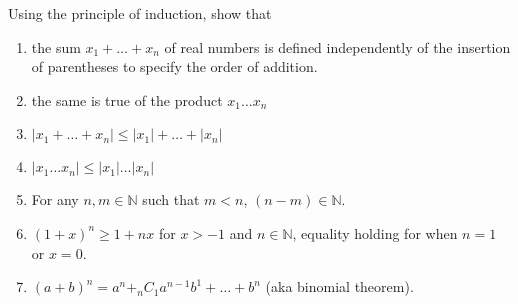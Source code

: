   \begin{exercise}[Zorich 2.2.1]
    Using the principle of induction, show that 
    \begin{enumerate}
      \item the sum $x_1 + \ldots + x_n$ of real numbers is defined independently of the insertion of parentheses to specify the order of addition. 
      \item the same is true of the product $x_1 \ldots x_n$ 
      \item $|x_1 + \ldots + x_n| \leq |x_1| + \ldots + |x_n|$ 
      \item $|x_1 \ldots x_n| \leq |x_1| \ldots |x_n|$
      \item For any $n, m \in \mathbb{N}$ such that $m < n$, $(n - m) \in \mathbb{N}$. 
      \item $(1 + x)^n \geq 1 + n x$ for $x > - 1$ and $n \in \mathbb{N}$, equality holding for when $n=1$ or $x=0$. 
      \item $(a + b)^n = a^n + _n C_1 a^{n-1} b^1 + \ldots + b^n$ (aka binomial theorem). 
    \end{enumerate}
  \end{exercise}
